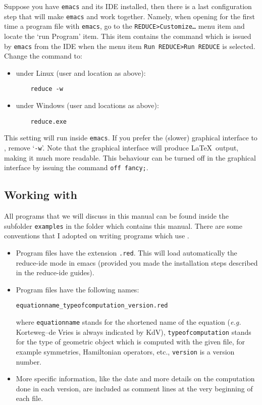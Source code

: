 Suppose you have \texttt{emacs} and its \REDUCE IDE installed, then there is a
last configuration step that will make \texttt{emacs} and \REDUCE work together.
Namely, when opening for the first time a \REDUCE program file with
\texttt{emacs}, go to the \texttt{REDUCE>Customize\dots} menu item and locate
the `\REDUCE run Program' item. This item contains the command which is issued
by \texttt{emacs} from the \REDUCE IDE when the menu item \texttt{Run REDUCE>Run
  REDUCE} is selected. Change the command to:
  \begin{itemize}
  \item under Linux (user and location as above):
   \begin{verbatim}
    reduce -w
    \end{verbatim}
  \item under Windows (user and locations as above):
   \begin{verbatim}
    reduce.exe
    \end{verbatim}
  \end{itemize}
This setting will run \REDUCE inside \texttt{emacs}. If you prefer the (slower)
graphical interface to \REDUCE, remove `\texttt{-w}'. Note that the graphical
interface will produce \LaTeX\ output, making it much more readable. This
behaviour can be turned off in the graphical interface by issuing the command
\texttt{off fancy;}.

\subsection{Working with \cdiff}

All programs that we will discuss in this manual can be found inside the
subfolder \texttt{examples} in the folder which contains this manual.  There
are some conventions that I adopted on writing programs which use \cdiff.
\begin{itemize}
\item Program files have the extension \texttt{.red}. This will load
  automatically the reduce-ide mode in emacs (provided you made the
  installation steps described in the reduce-ide guides).
\item Program files have the following names:
  \begin{center}
    \texttt{equationname\_typeofcomputation\_version.red}
  \end{center}
  where \texttt{equationname} stands for the shortened name of the equation
  (\emph{e.g.} Korteweg--de Vries is always indicated by KdV),
  \texttt{typeofcomputation} stands for the type of geometric object which is
  computed with the given file, for example symmetries, Hamiltonian operators,
  etc., \texttt{version} is a version number.
\item More specific information, like the date and more details on the
  computation done in each version, are included as comment lines at the very
  beginning of each file.
\end{itemize}

